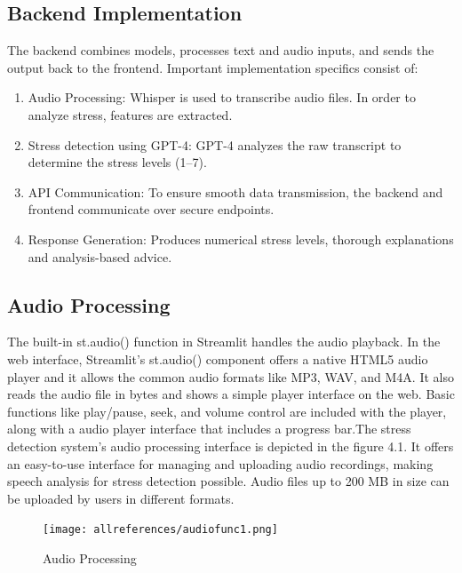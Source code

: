 \documentclass[Arial,12pt,openright,twoside]{book}
\begin{document}
\begin{enumerate}
 \section{Backend Implementation}
 The backend combines models, processes text and audio inputs, and sends the output back to the frontend. Important implementation specifics consist of: 
\begin{enumerate}
\item Audio Processing: Whisper is used to transcribe audio files. In order to analyze stress, features are extracted. 
\item Stress detection using GPT-4:  GPT-4 analyzes the raw transcript to determine the stress levels (1–7). 
\item API Communication: To ensure smooth data transmission, the backend and frontend communicate over secure endpoints. 
\item Response Generation: Produces numerical stress levels, thorough explanations and analysis-based advice. 
\end{enumerate}

\vspace{10pt} %
\subsection{Audio Processing}
The built-in st.audio() function in Streamlit handles the audio playback. In the web interface, Streamlit's st.audio() component offers a native HTML5 audio player and it allows the common audio formats like MP3, WAV, and M4A. It also reads the audio file in bytes and shows a simple player interface on the web. Basic functions like play/pause, seek, and volume control are included with the player, along with a audio player interface that includes a progress bar.The stress detection system's audio processing interface is depicted in the figure 4.1. It offers an easy-to-use interface for managing and uploading audio recordings, making speech analysis for stress detection possible. Audio files up to 200 MB in size can be uploaded by users in different formats.
\FloatBarrier
\vspace{-5pt}
\begin{figure}[htbp!] %
    \centering
    \texttt{[image: allreferences/audiofunc1.png]}
    \caption{Audio Processing}
    \label{fig:audio_processing}
\end{figure}

\end{enumerate}
\end{document}
